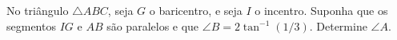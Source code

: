 No triângulo $\triangle ABC$, seja $G$ o baricentro, e seja $I$ o incentro. Suponha que os segmentos $IG$ e $AB$ são paralelos e que $\angle B = 2 \tan^{-1}(1/3)$. Determine $\angle A$.
